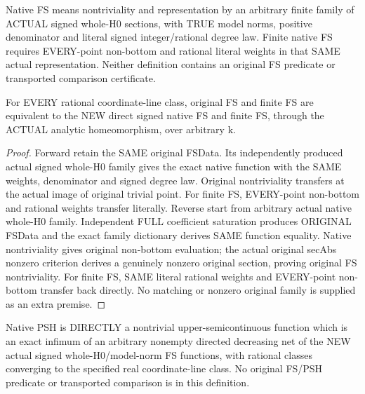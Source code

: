 \begin{definition}
\label{def:seven-native-direct-signed-fs-arbitrary-field}
\leanok
Native FS means nontriviality and representation by an arbitrary finite
family of ACTUAL signed whole-H0 sections, with TRUE model norms,
positive denominator and literal signed integer/rational degree law.
Finite native FS requires EVERY-point non-bottom and rational literal
weights in that SAME actual representation. Neither definition contains
an original FS predicate or transported comparison certificate.
\end{definition}

\begin{theorem}
\label{thm:seven-native-original-signed-fs-class-arbitrary-field}
\leanok
For EVERY rational coordinate-line class, original FS and finite FS
are equivalent to the NEW direct signed native FS and finite FS,
through the ACTUAL analytic homeomorphism, over arbitrary k.
\end{theorem}
\begin{proof}
Forward retain the SAME original FSData. Its independently produced
actual signed whole-H0 family gives the exact native function with the
SAME weights, denominator and signed degree law. Original nontriviality
transfers at the actual image of original trivial point. For finite FS,
EVERY-point non-bottom and rational weights transfer literally.
Reverse start from arbitrary actual native whole-H0 family. Independent
FULL coefficient saturation produces ORIGINAL FSData and the exact
family dictionary derives SAME function equality. Native nontriviality
gives original non-bottom evaluation; the actual original secAbs
nonzero criterion derives a genuinely nonzero original section, proving
original FS nontriviality. For finite FS, SAME literal rational weights
and EVERY-point non-bottom transfer back directly. No matching or
nonzero original family is supplied as an extra premise.
\end{proof}

\begin{definition}
\label{def:seven-native-direct-signed-psh-arbitrary-field}
\leanok
Native PSH is DIRECTLY a nontrivial upper-semicontinuous function which
is an exact infimum of an arbitrary nonempty directed decreasing net
of the NEW actual signed whole-H0/model-norm FS functions, with rational
classes converging to the specified real coordinate-line class.
No original FS/PSH predicate or transported comparison is in this definition.
\end{definition}

